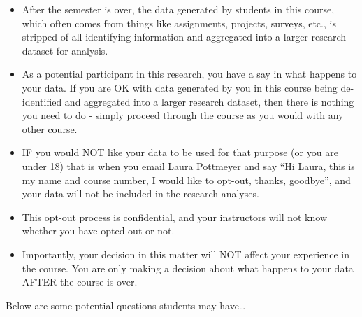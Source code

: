 \documentclass[]{tufte-handout}
\providecommand{\tightlist}{%
  \setlength{\itemsep}{0pt}\setlength{\parskip}{0pt}}
\begin{document}
\begin{itemize}
\tightlist
\item
  After the semester is over, the data generated by students in this
  course, which often comes from things like assignments, projects,
  surveys, etc., is stripped of all identifying information and
  aggregated into a larger research dataset for analysis.
\item
  As a potential participant in this research, you have a say in what
  happens to your data. If you are OK with data generated by you in this
  course being de-identified and aggregated into a larger research
  dataset, then there is nothing you need to do - simply proceed through
  the course as you would with any other course.
\item
  IF you would NOT like your data to be used for that purpose (or you
  are under 18) that is when you email Laura Pottmeyer and say ``Hi
  Laura, this is my name and course number, I would like to opt-out,
  thanks, goodbye'', and your data will not be included in the research
  analyses.
\item
  This opt-out process is confidential, and your instructors will not
  know whether you have opted out or not.
\item
  Importantly, your decision in this matter will NOT affect your
  experience in the course. You are only making a decision about what
  happens to your data AFTER the course is over.
\end{itemize}

Below are some potential questions students may have\ldots{}
\end{document}
